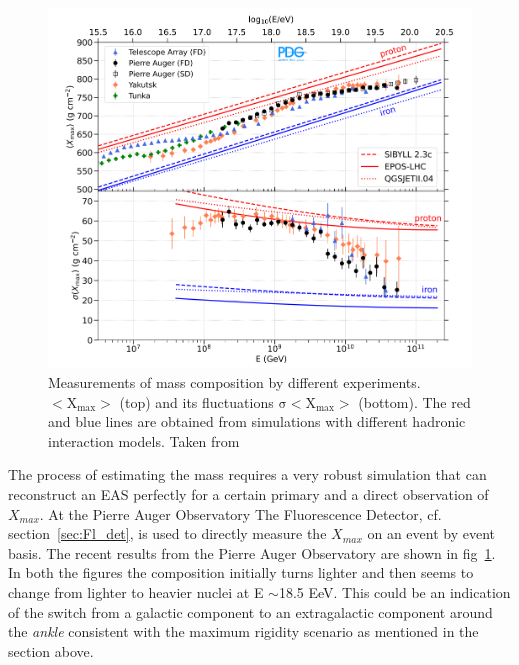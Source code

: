 \begin{figure}[t!]
  \centering
  \includegraphics[width=14.5cm]{thesis_figures/CRnNu/Composition_measurement.png}
  \caption{Measurements of mass composition by different experiments. $\mathrm{<X_{max}>}$ (top) and its fluctuations $\mathrm{\sigma<X_{max}>}$ (bottom). The red and blue lines are obtained from simulations with different hadronic interaction models. Taken from ~\cite{ParticleDataGroup:2024cfk}}
  \label{fig:CR-composition}
\end{figure}

The process of estimating the mass requires a very robust simulation that can reconstruct an EAS perfectly for a certain primary and a direct observation of $X_{max}$. At the Pierre Auger Observatory The Fluorescence Detector, cf. section~\ref{sec:Fl_det}, is used to directly measure the $X_{max}$ on an event by event basis. The recent results from the Pierre Auger Observatory are shown in fig~\ref{fig:CR-composition}. In both the figures the composition initially turns lighter and then seems to change from lighter to heavier nuclei at E $\sim$18.5 EeV. This could be an indication of the switch from a galactic component to an extragalactic component around the \textit{ankle} consistent with the maximum rigidity scenario as mentioned in the section above.


